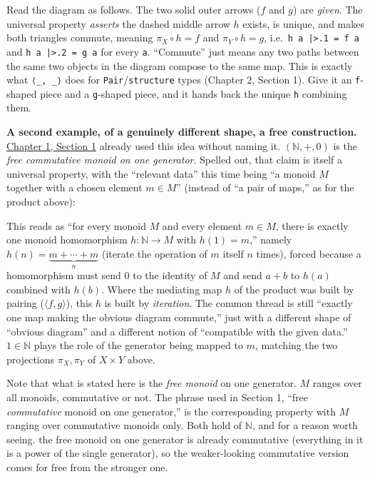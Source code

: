 Read the diagram as follows. The two solid outer arrows (\(f\) and \(g\)) are \emph{given}. The universal property \emph{asserts} the dashed middle arrow \(h\) exists, is unique, and makes both triangles commute, meaning \(\pi_X \circ h = f\) and \(\pi_Y \circ h = g\), i.e.~\texttt{h a |>.1 = f a} and \texttt{h a |>.2 = g a} for every \texttt{a}. ``Commute'' just means any two paths between the same two objects in the diagram compose to the same map. This is exactly what \texttt{⟨\_\allowbreak{}, \_\allowbreak{}⟩} does for \texttt{Pair}/\texttt{structure} types (Chapter 2, Section 1). Give it an \texttt{f}-shaped piece and a \texttt{g}-shaped piece, and it hands back the unique \texttt{h} combining them.

\textbf{A second example, of a genuinely different shape, a free construction.} \hyperref[sec:01-basics:01-everything-has-a-type:1]{Chapter 1, Section 1} already used this idea without naming it. \((\mathbb{N}, +, 0)\) is the \emph{free commutative monoid on one generator}. Spelled out, that claim is itself a universal property, with the ``relevant data'' this time being ``a monoid \(M\) together with a chosen element \(m \in M\)'' (instead of ``a pair of maps,'' as for the product above):

\begin{center}

\end{center}

This reads as ``for every monoid \(M\) and every element \(m \in M\), there is exactly one monoid homomorphism \(h : \mathbb{N} \to M\) with \(h(1) = m\),'' namely \(h(n) = \underbrace{m + \cdots + m}_{n}\) (iterate the operation of \(m\) itself \(n\) times), forced because a homomorphism must send \(0\) to the identity of \(M\) and send \(a+b\) to \(h(a)\) combined with \(h(b)\). Where the mediating map \(h\) of the product was built by pairing (\(\langle f, g\rangle\)), this \(h\) is built by \emph{iteration}. The common thread is still ``exactly one map making the obvious diagram commute,'' just with a different shape of ``obvious diagram'' and a different notion of ``compatible with the given data.'' \(1 \in \mathbb{N}\) plays the role of the generator being mapped to \(m\), matching the two projections \(\pi_X,\pi_Y\) of \(X\times Y\) above.

Note that what is stated here is the \emph{free monoid} on one generator. \(M\) ranges over all monoids, commutative or not. The phrase used in Section 1, ``free \emph{commutative} monoid on one generator,'' is the corresponding property with \(M\) ranging over commutative monoids only. Both hold of \(\mathbb{N}\), and for a reason worth seeing. the free monoid on one generator is already commutative (everything in it is a power of the single generator), so the weaker-looking commutative version comes for free from the stronger one.

